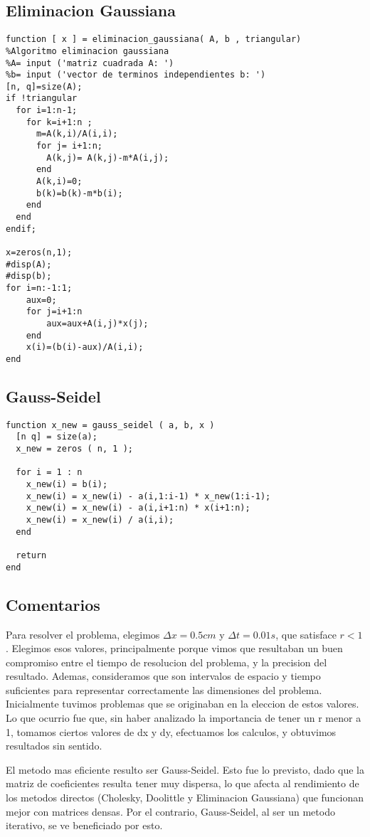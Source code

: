 \documentclass{article}
\begin{document}
\subsection{Eliminacion Gaussiana}
\begin{verbatim}
function [ x ] = eliminacion_gaussiana( A, b , triangular)
%Algoritmo eliminacion gaussiana
%A= input ('matriz cuadrada A: ')
%b= input ('vector de terminos independientes b: ')
[n, q]=size(A);
if !triangular
  for i=1:n-1;
    for k=i+1:n ;
      m=A(k,i)/A(i,i);
      for j= i+1:n;
        A(k,j)= A(k,j)-m*A(i,j);
      end
      A(k,i)=0;
      b(k)=b(k)-m*b(i);
    end
  end
endif;

x=zeros(n,1);
#disp(A);
#disp(b);
for i=n:-1:1;
    aux=0;
    for j=i+1:n
        aux=aux+A(i,j)*x(j);
    end
    x(i)=(b(i)-aux)/A(i,i);
end
\end{verbatim}

\subsection{Gauss-Seidel}
\begin{verbatim}
function x_new = gauss_seidel ( a, b, x )
  [n q] = size(a);
  x_new = zeros ( n, 1 );

  for i = 1 : n
    x_new(i) = b(i);
    x_new(i) = x_new(i) - a(i,1:i-1) * x_new(1:i-1);
    x_new(i) = x_new(i) - a(i,i+1:n) * x(i+1:n);
    x_new(i) = x_new(i) / a(i,i);
  end

  return
end
\end{verbatim}

\subsection{Comentarios}
Para resolver el problema, elegimos $\Delta x= 0.5 cm$ 
y $\Delta t = 0.01s$, que satisface $ r<1$. Elegimos esos
valores, principalmente porque vimos que resultaban un buen compromiso
entre el tiempo de resolucion del problema, y la precision del
resultado. Ademas, consideramos que son intervalos de espacio y tiempo
suficientes para representar correctamente las dimensiones del
problema. 
Inicialmente tuvimos problemas que se originaban en la eleccion de
estos valores. Lo que ocurrio fue que, sin haber analizado la
importancia de tener un r menor a 1, tomamos ciertos valores de dx y dy, efectuamos los calculos,
y obtuvimos resultados sin sentido.



El metodo mas eficiente resulto ser Gauss-Seidel. Esto fue lo
previsto, dado que la matriz de coeficientes resulta tener muy
dispersa, lo que afecta al rendimiento de los metodos directos
(Cholesky, Doolittle y Eliminacion Gaussiana) que funcionan mejor con
matrices densas. Por el contrario, Gauss-Seidel, al ser un metodo
iterativo, se ve beneficiado por esto.
\end{document}
